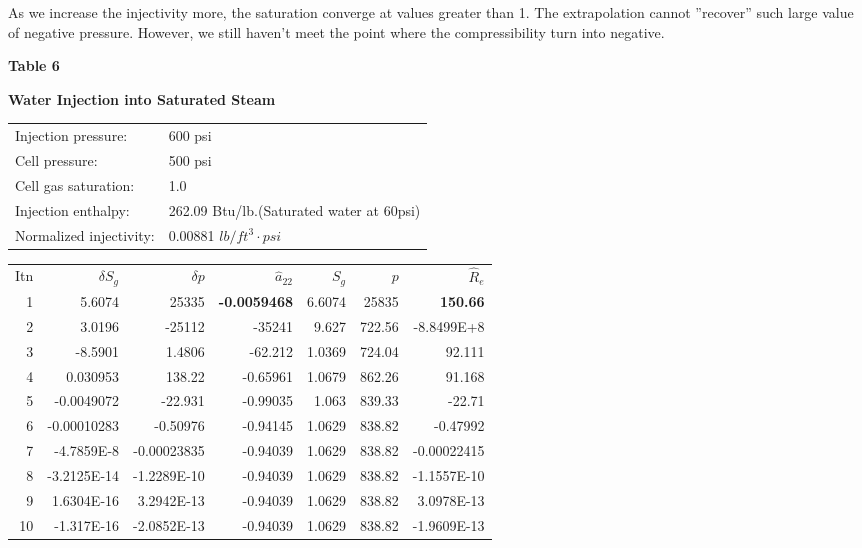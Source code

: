 \documentclass[11pt]{article}
\begin{document}
    As we increase the injectivity more, the saturation converge at values greater
    than 1. The extrapolation cannot ''recover'' such large value of negative pressure.
    However, we still haven't meet the point where the compressibility turn into negative.

\newpage
\centerline{\textbf{Table 6 }}
\centerline{\textbf{Water Injection into Saturated Steam}}
\vspace{20pt}

\begin{tabular}{ l l }
    Injection pressure: & 600 psi \\
    Cell pressure: & 500 psi \\
    Cell gas saturation: & 1.0 \\
    Injection enthalpy: & 262.09 Btu/lb.(Saturated water at 60psi) \\
    Normalized injectivity: & 0.00881 $lb/ft^3\cdot psi$\\
\end{tabular}
\vspace{20pt}

\begin{table}[H]
\centering
\begin{tabular}{ r r r r r r r }
    Itn & $\delta S_g$ & $\delta p$ & $\hat{a}_{22}$ &
    $S_g$ & $p$ & $\hat{R}_e$ \\
    1 & 5.6074 & 25335 & \textbf{-0.0059468} & 6.6074 & 25835 & \textbf{150.66} \\
    2 & 3.0196 & -25112 & -35241 & 9.627 & 722.56 & -8.8499E+8 \\
    3 & -8.5901 & 1.4806 & -62.212 & 1.0369 & 724.04 & 92.111 \\
    4 & 0.030953 & 138.22 & -0.65961 & 1.0679 & 862.26 & 91.168 \\
    5 & -0.0049072 & -22.931 & -0.99035 & 1.063 & 839.33 & -22.71 \\
    6 & -0.00010283 & -0.50976 & -0.94145 & 1.0629 & 838.82 & -0.47992 \\
    7 & -4.7859E-8 & -0.00023835 & -0.94039 & 1.0629 & 838.82 & -0.00022415 \\
    8 & -3.2125E-14 & -1.2289E-10 & -0.94039 & 1.0629 & 838.82 & -1.1557E-10 \\
    9 & 1.6304E-16 & 3.2942E-13 & -0.94039 & 1.0629 & 838.82 & 3.0978E-13 \\
    10 & -1.317E-16 & -2.0852E-13 & -0.94039 & 1.0629 & 838.82 & -1.9609E-13 \\
\end{tabular}
\end{table}
\end{document}
